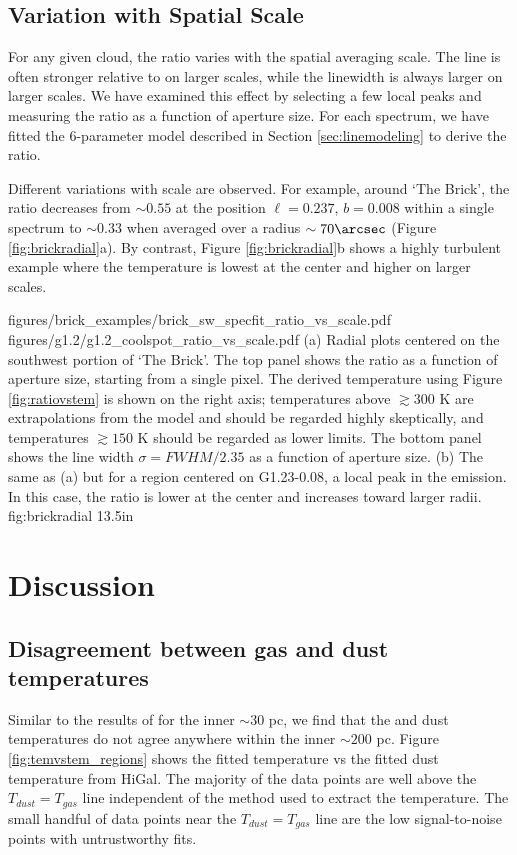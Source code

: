\subsection{Variation with Spatial Scale}
For any given cloud, the ratio \Rone varies with the spatial averaging scale.
The \para \threeohthree line is often stronger relative to \threetwoone on
larger scales, while the linewidth is always larger on larger scales.  We have
examined this effect by selecting a few local \para \threeohthree peaks and
measuring the ratio \Rone as a function of aperture size.  For each spectrum,
we have fitted the 6-parameter model described in Section
\ref{sec:linemodeling} to derive the ratio.

Different variations with scale are observed.  For example, around `The Brick',
the ratio decreases from $\sim0.55$ at the position $\ell=0.237$, $b=0.008$
within a single spectrum to $\sim0.33$ when averaged over a radius
$\sim70\arcsec$ (Figure \ref{fig:brickradial}a).  By contrast, Figure
\ref{fig:brickradial}b shows a highly turbulent example where the temperature
is lowest at the center and higher on larger scales.

\FigureTwo
{figures/brick_examples/brick_sw_specfit_ratio_vs_scale.pdf}
{figures/g1.2/g1.2_coolspot_ratio_vs_scale.pdf}
{(a) Radial plots centered on the southwest portion of `The Brick'.
The top panel shows the ratio \Rone as a function of aperture size, starting
from a single pixel.
The derived temperature using Figure \ref{fig:ratiovstem} is shown on the right
axis; temperatures above $\gtrsim300$ K are extrapolations from the model and
should be regarded highly skeptically, and temperatures $\gtrsim150$ K should
be regarded as lower limits.
The bottom panel shows the line width $\sigma = FWHM/2.35$
as a function of aperture size.  
(b) The same as (a) but for a region centered on G1.23-0.08, a local
peak in the \para \threeohthree emission.  In this case,
the ratio \Rone is lower at the center and increases toward larger radii.
}
{fig:brickradial}
{1}{3.5in}



\section{Discussion}
\subsection{Disagreement between gas and dust temperatures}
Similar to the results of \citet{Ao2013a} for the inner $\sim30$ pc, we find
that the \para and dust temperatures do not agree anywhere within the inner
$\sim200$ pc.  Figure \ref{fig:temvstem_regions} shows the fitted \para
temperature vs the fitted dust temperature from HiGal.  The majority of the
\formaldehyde data points are well above the $T_{dust}=T_{gas}$ line
independent of the method used to extract the temperature.  The small handful
of data points near the $T_{dust}=T_{gas}$ line are the low signal-to-noise
points with untrustworthy fits.

